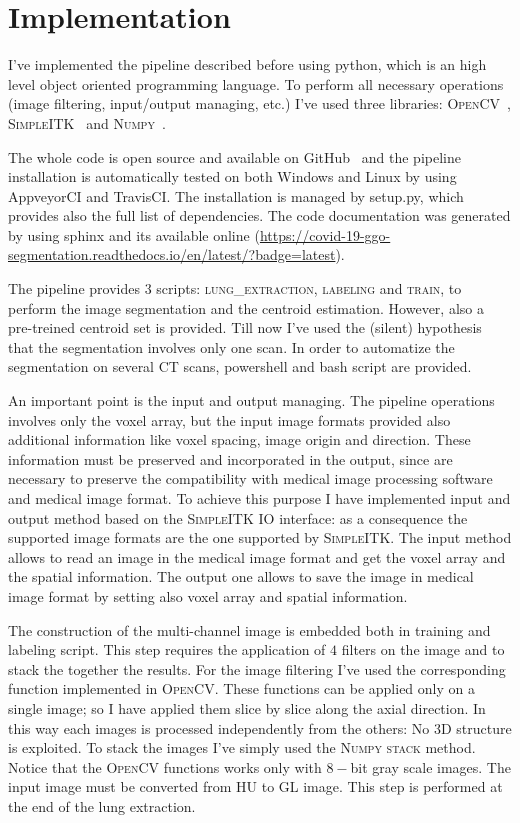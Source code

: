 
	
	\section{Implementation}
	
	
	I've implemented the pipeline described before using python, which is an high level object oriented programming language. To perform all necessary operations (image filtering, input/output managing, etc.) I've used three libraries: \textsc{OpenCV}~\cite{OpenCV}, \textsc{SimpleITK}~\cite{SimpleITK} and \textsc{Numpy}~\cite{Numpy}.
	
	The whole code is open source and available on GitHub~\cite{REP:CTLungSeg} and the pipeline installation is automatically tested on both Windows and Linux by using AppveyorCI and TravisCI.  The installation is managed by setup.py, which provides also the full list of dependencies. The code documentation was generated by using sphinx and its available online (\url{https://covid-19-ggo-segmentation.readthedocs.io/en/latest/?badge=latest}). 
	
	The pipeline provides $3$ scripts: \textsc{lung\_extraction}, \textsc{labeling} and \textsc{train}, to perform the image segmentation and the centroid estimation. However, also a pre-treined centroid set is provided. Till now I've used the (silent) hypothesis that the segmentation involves only one scan. In order to automatize the segmentation on several CT scans, powershell and bash script are provided.
	
	An important point is the input and output managing. The pipeline operations involves only the voxel array, but the input image formats provided also additional information like voxel spacing, image origin and direction. These information must be preserved and incorporated in the output, since are necessary to preserve the compatibility with medical image processing software and medical image format. 
	To achieve this purpose I have implemented input and output method based on the \textsc{SimpleITK} IO interface: as a consequence the supported image formats are the one supported by \textsc{SimpleITK}. The input method allows to read an image in the medical image format and get the voxel array and the spatial information. The output one allows to save the image in medical image format by setting also voxel array and spatial information.

	
	The construction of the multi-channel image is embedded both in training and labeling script. This step requires the application of $4$ filters on the image and to stack the together the results. For the image filtering I've used the corresponding function implemented in \textsc{OpenCV}. These functions can be applied only on a single image; so I have applied them slice by slice along the axial direction. In this way each images is processed independently from the others: No 3D structure is exploited. To stack the images I've simply used the \textsc{Numpy} \textsc{stack} method.
	Notice that the \textsc{OpenCV} functions works only with $8-$bit gray scale images. The input image must be converted from HU to GL image. This step is performed at the end of the lung extraction.
	



	
	

 
